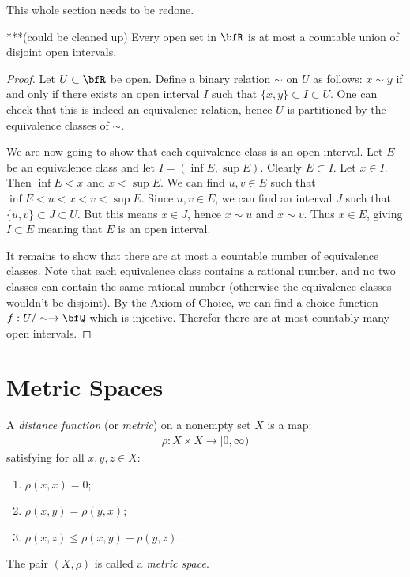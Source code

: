     This whole section needs to be redone.

    \begin{proposition}***(could be cleaned up)
        Every open set in $\bfR$ is at most a countable union of disjoint open intervals.
    \end{proposition}
        \begin{proof}
        Let $U \subset \bfR$ be open. Define a binary relation $\sim$ on $U$ as follows: $x \sim y$ if and only if there exists an open interval $I$ such that $\{x,y\} \subset I \subset U$. One can check that this is indeed an equivalence relation, hence $U$ is partitioned by the equivalence classes of $\sim$.
        
        We are now going to show that each equivalence class is an open interval. Let $E$ be an equivalence class and let $I = (\inf E, \sup E)$. Clearly $E \subset I$. Let $x \in I$. Then $\inf E < x$ and $x < \sup E$. We can find $u,v \in E$ such that $\inf E < u < x < v < \sup E$. Since $u,v \in E$, we can find an interval $J$ such that $\{u,v\} \subset J \subset U$. But this means $x \in J$, hence $x \sim u$ and $x \sim v$. Thus $x \in E$, giving $I \subset E$ meaning that $E$ is an open interval.

        It remains to show that there are at most a countable number of equivalence classes. Note that each equivalence class contains a rational number, and no two classes can contain the same rational number (otherwise the equivalence classes wouldn't be disjoint). By the Axiom of Choice, we can find a choice function $f:U/\sim \rightarrow \bfQ$ which is injective. Therefor there are at most countably many open intervals.
        \end{proof}

\section{Metric Spaces}
    \begin{definition}
        A \textit{distance function} (or \textit{metric}) on a nonempty set $X$ is a map:
            \begin{equation*}
            \begin{split}
                \rho:X \times X \rightarrow [0,\infty)
            \end{split}
            \end{equation*}
        satisfying for all $x,y,z \in X$:
            \begin{enumerate}[label = (\arabic*),itemsep=1pt,topsep=3pt]
                \item $\rho(x,x) = 0$;
                \item $\rho(x,y) = \rho(y,x)$;
                \item $\rho(x,z) \leq \rho(x,y) + \rho(y,z)$.
            \end{enumerate}
        The pair $(X,\rho)$ is called a \textit{metric space}.
    \end{definition}

